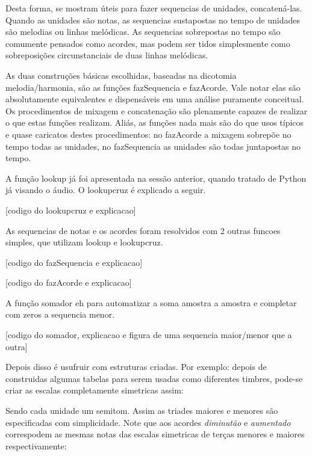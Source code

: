 Desta forma, se mostram úteis para fazer sequencias de unidades, concatená-las. Quando as unidades
são notas, as sequencias sustapostas no tempo de unidades são melodias ou linhas melódicas. As
sequencias sobrepostas no tempo são comumente pensados como acordes, mas podem ser tidos simplesmente
como sobreposições circunstanciais de duas linhas melódicas.

As duas construções básicas escolhidas, baseadas na dicotomia melodia/harmonia, são
as funções fazSequencia e fazAcorde. Vale notar elas são absolutamente equivalentes e dispensáveis
em uma análise puramente conceitual. Os procedimentos de mixagem e concatenação são
plenamente capazes de realizar o que estas funções realizam. Aliás, as funções nada
mais são do que usos típicos e quase caricatos destes procedimentos: no fazAcorde a mixagem
sobrepõe no tempo todas as unidades, no fazSequencia as unidades são todas juntapostas no tempo.

 A função
lookup já foi apresentada na sessão anterior, quando tratado de Python já visando o áudio.
O lookupcruz é explicado a seguir.

[codigo do lookupcruz e explicacao]

As sequencias de notas e os acordes foram resolvidos com 2 outras funcoes simples,
que utilizam lookup e lookupcruz.

[codigo do fazSequencia e explicacao]

[codigo do fazAcorde e explicacao]

A função somador eh para automatizar a soma amostra a amostra e completar com zeros a
sequencia menor.

[codigo do somador, explicacao e figura de uma sequencia maior/menor que a outra]

Depois disso é usufruir com estruturas criadas. Por exemplo: depois de construidas
algumas tabelas para serem usadas como diferentes timbres, pode-se criar as
escalas completamente simetricas assim:


% 

Sendo cada unidade um semitom. Assim as triades maiores e menores
são especificadas com simplicidade. Note que aos acordes \emph{diminutão} e
\emph{aumentado} correspodem as mesmas notas das escalas simetricas de terças menores
e maiores respectivamente:


